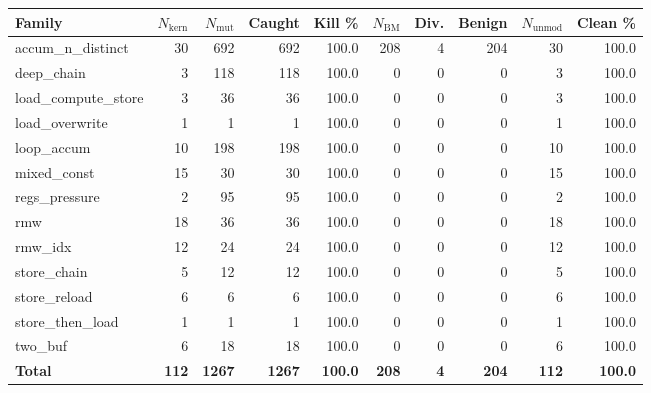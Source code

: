 \begin{tabular}{lrrrrrrrrr}
\toprule
Family & $N_{\text{kern}}$ & $N_{\text{mut}}$ & Caught & Kill \% & $N_{\text{BM}}$ & Div. & Benign & $N_{\text{unmod}}$ & Clean \% \\
\midrule
accum\_n\_distinct & 30 & 692 & 692 & 100.0 & 208 & 4 & 204 & 30 & 100.0 \\
deep\_chain & 3 & 118 & 118 & 100.0 & 0 & 0 & 0 & 3 & 100.0 \\
load\_compute\_store & 3 & 36 & 36 & 100.0 & 0 & 0 & 0 & 3 & 100.0 \\
load\_overwrite & 1 & 1 & 1 & 100.0 & 0 & 0 & 0 & 1 & 100.0 \\
loop\_accum & 10 & 198 & 198 & 100.0 & 0 & 0 & 0 & 10 & 100.0 \\
mixed\_const & 15 & 30 & 30 & 100.0 & 0 & 0 & 0 & 15 & 100.0 \\
regs\_pressure & 2 & 95 & 95 & 100.0 & 0 & 0 & 0 & 2 & 100.0 \\
rmw & 18 & 36 & 36 & 100.0 & 0 & 0 & 0 & 18 & 100.0 \\
rmw\_idx & 12 & 24 & 24 & 100.0 & 0 & 0 & 0 & 12 & 100.0 \\
store\_chain & 5 & 12 & 12 & 100.0 & 0 & 0 & 0 & 5 & 100.0 \\
store\_reload & 6 & 6 & 6 & 100.0 & 0 & 0 & 0 & 6 & 100.0 \\
store\_then\_load & 1 & 1 & 1 & 100.0 & 0 & 0 & 0 & 1 & 100.0 \\
two\_buf & 6 & 18 & 18 & 100.0 & 0 & 0 & 0 & 6 & 100.0 \\
\midrule
\textbf{Total} & \textbf{112} & \textbf{1267} & \textbf{1267} & \textbf{100.0} & \textbf{208} & \textbf{4} & \textbf{204} & \textbf{112} & \textbf{100.0} \\
\bottomrule
\end{tabular}
